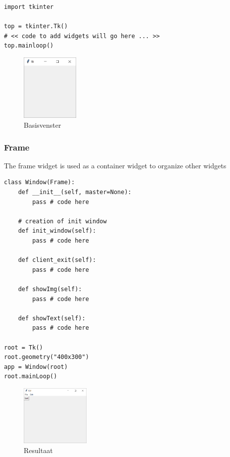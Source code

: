 \documentclass{article}
\begin{document}
\begin{verbatim}
import tkinter

top = tkinter.Tk()
# << code to add widgets will go here ... >>
top.mainloop()
\end{verbatim}


\begin{figure}[H]
    \centering
    \includegraphics[width=0.25\textwidth]{tkinter-start.png}
    \caption{Basisvenster}
\end{figure}

\subsubsection{Frame}

The frame widget is used as a container widget to organize other widgets

\begin{verbatim}
class Window(Frame):
    def __init__(self, master=None):
        pass # code here

    # creation of init window
    def init_window(self):
        pass # code here

    def client_exit(self):
        pass # code here

    def showImg(self):
        pass # code here

    def showText(self):
        pass # code here

root = Tk()
root.geometry("400x300")
app = Window(root)
root.mainLoop()
\end{verbatim}

\begin{figure}[H]
    \centering
    \includegraphics[width=0.3\textwidth]{tkinter-frame.png}
    \caption{Resultaat}
\end{figure}
\end{document}
